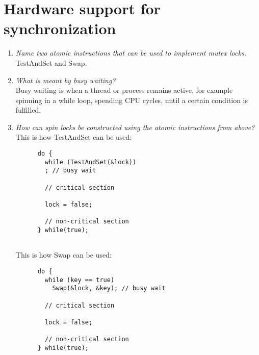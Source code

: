 \documentclass[a4paper]{article}
\begin{document}
\section{Hardware support for synchronization}
\begin{enumerate}

  \item  \textit{Name two atomic instructions that can be used to implement mutex locks. }\\

    TestAndSet and Swap.

  \item \textit{ What is meant by busy waiting? }\\

    Busy waiting is when a thread or process remains active, for example spinning in a while loop, spending CPU cycles, until a certain condition is fulfilled.

  \item \textit{ How can spin locks be constructed using the atomic instructions from above? }\\

    This is how TestAndSet can be used:
    \begin{lstlisting}
      do {
        while (TestAndSet(&lock))
        ; // busy wait

        // critical section

        lock = false;

        // non-critical section
      } while(true);
     
    \end{lstlisting}

    This is how Swap can be used:
    \begin{lstlisting}
      do {
        while (key == true)
          Swap(&lock, &key); // busy wait

        // critical section

        lock = false;

        // non-critical section
      } while(true);
     
    \end{lstlisting}


\end{enumerate}
\end{document}
